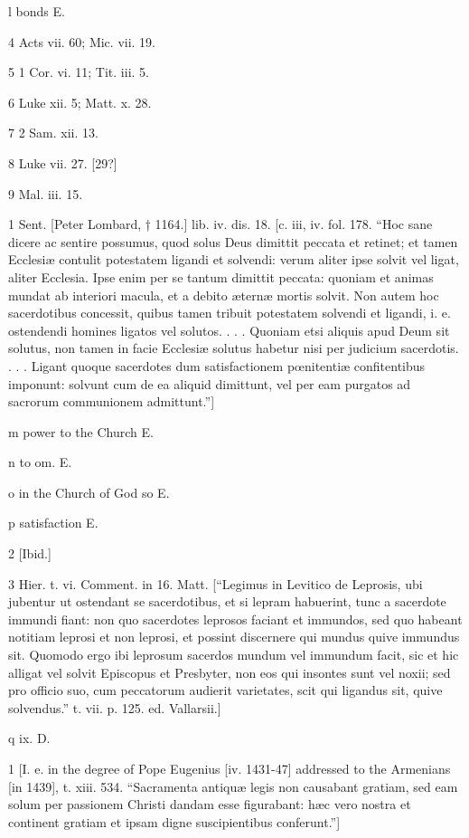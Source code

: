 l
bonds E.

4
Acts vii. 60; Mic. vii. 19.

5
1 Cor. vi. 11; Tit. iii. 5.

6
Luke xii. 5; Matt. x. 28.

7
2 Sam. xii. 13.

8
Luke vii. 27. [29?]

9
Mal. iii. 15.

1
Sent. [Peter Lombard, † 1164.] lib. iv. dis. 18. [c. iii, iv. fol. 178. “Hoc sane dicere ac sentire possumus, quod solus Deus dimittit peccata et retinet; et tamen Ecclesiæ contulit potestatem ligandi et solvendi: verum aliter ipse solvit vel ligat, aliter Ecclesia. Ipse enim per se tantum dimittit peccata: quoniam et animas mundat ab interiori macula, et a debito æternæ mortis solvit. Non autem hoc sacerdotibus concessit, quibus tamen tribuit potestatem solvendi et ligandi, i. e. ostendendi homines ligatos vel solutos. . . . Quoniam etsi aliquis apud Deum sit solutus, non tamen in facie Ecclesiæ solutus habetur nisi per judicium sacerdotis. . . . Ligant quoque sacerdotes dum satisfactionem pœnitentiæ confitentibus imponunt: solvunt cum de ea aliquid dimittunt, vel per eam purgatos ad sacrorum communionem admittunt.”]

m
power to the Church E.

n
to om. E.

o
in the Church of God so E.

p
satisfaction E.

2
[Ibid.]

3
Hier. t. vi. Comment. in 16. Matt. [“Legimus in Levitico de Leprosis, ubi jubentur ut ostendant se sacerdotibus, et si lepram habuerint, tunc a sacerdote immundi fiant: non quo sacerdotes leprosos faciant et immundos, sed quo habeant notitiam leprosi et non leprosi, et possint discernere qui mundus quive immundus sit. Quomodo ergo ibi leprosum sacerdos mundum vel immundum facit, sic et hic alligat vel solvit Episcopus et Presbyter, non eos qui insontes sunt vel noxii; sed pro officio suo, cum peccatorum audierit varietates, scit qui ligandus sit, quive solvendus.” t. vii. p. 125. ed. Vallarsii.]

q
ix. D.

1
[I. e. in the degree of Pope Eugenius [iv. 1431-47] addressed to the Armenians [in 1439], t. xiii. 534. “Sacramenta antiquæ legis non causabant gratiam, sed eam solum per passionem Christi dandam esse figurabant: hæc vero nostra et continent gratiam et ipsam digne suscipientibus conferunt.”]

